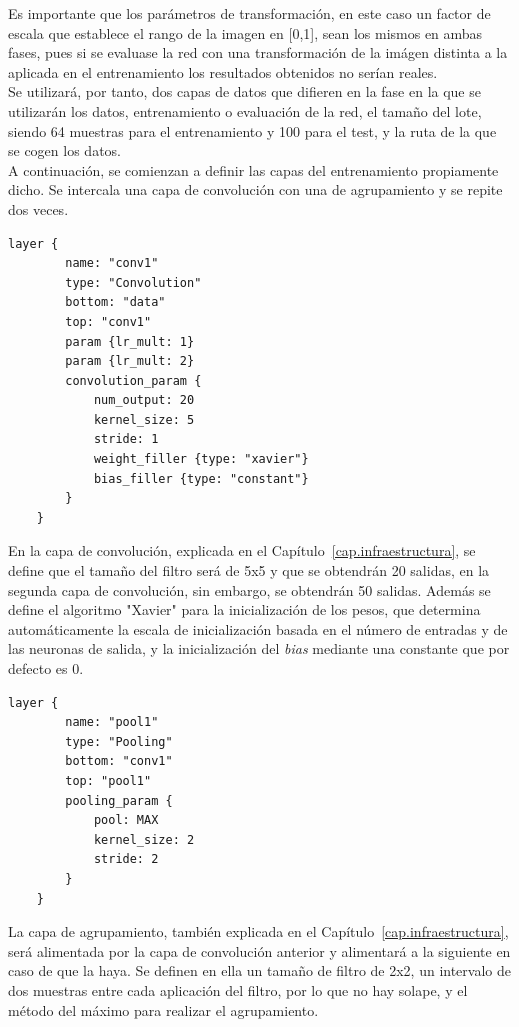 \begin{description}
	Es importante que los parámetros de transformación, en este caso un factor de escala que establece el rango de la imagen en [0,1], sean los mismos en ambas fases, pues si se evaluase la red con una transformación de la imágen distinta a la aplicada en el entrenamiento los resultados obtenidos no serían reales.\\
	Se utilizará, por tanto, dos capas de datos que difieren en la fase en la que se utilizarán los datos, entrenamiento o evaluación de la red, el tamaño del lote, siendo 64 muestras para el entrenamiento y 100 para el test, y la ruta de la que se cogen los datos.\\
	
	A continuación, se comienzan a definir las capas del entrenamiento propiamente dicho. Se intercala una capa de convolución con una de agrupamiento y se repite dos veces.
	\vspace{5pt}
	\begin{lstlisting}[frame=single]
	layer {
		name: "conv1"
		type: "Convolution"
		bottom: "data"
		top: "conv1"
		param {lr_mult: 1}
		param {lr_mult: 2}
		convolution_param {
			num_output: 20
			kernel_size: 5
			stride: 1
			weight_filler {type: "xavier"}
			bias_filler {type: "constant"}
		}
	}	
	\end{lstlisting}
	
	En la capa de convolución, explicada en el Capítulo~\ref{cap.infraestructura}, se define que el tamaño del filtro será de 5x5 y que se obtendrán 20 salidas, en la segunda capa de convolución, sin embargo, se obtendrán 50 salidas. Además se define el algoritmo "Xavier" para la inicialización de los pesos, que determina automáticamente la escala de inicialización basada en el número de entradas y de las neuronas de salida, y la inicialización del \textit{bias} mediante una constante que por defecto es 0.
	\vspace{5pt}
	\begin{lstlisting}[frame=single]
	layer {
		name: "pool1"
		type: "Pooling"
		bottom: "conv1"
		top: "pool1"
		pooling_param {
			pool: MAX
			kernel_size: 2
			stride: 2
		}
	}	
	\end{lstlisting}
	
	La capa de agrupamiento, también explicada en el Capítulo~\ref{cap.infraestructura}, será alimentada por la capa de convolución anterior y alimentará a la siguiente en caso de que la haya. Se definen en ella un tamaño de filtro de 2x2, un intervalo de dos muestras entre cada aplicación del filtro, por lo que no hay solape, y el método del máximo para realizar el agrupamiento.\\
	

\end{description}
